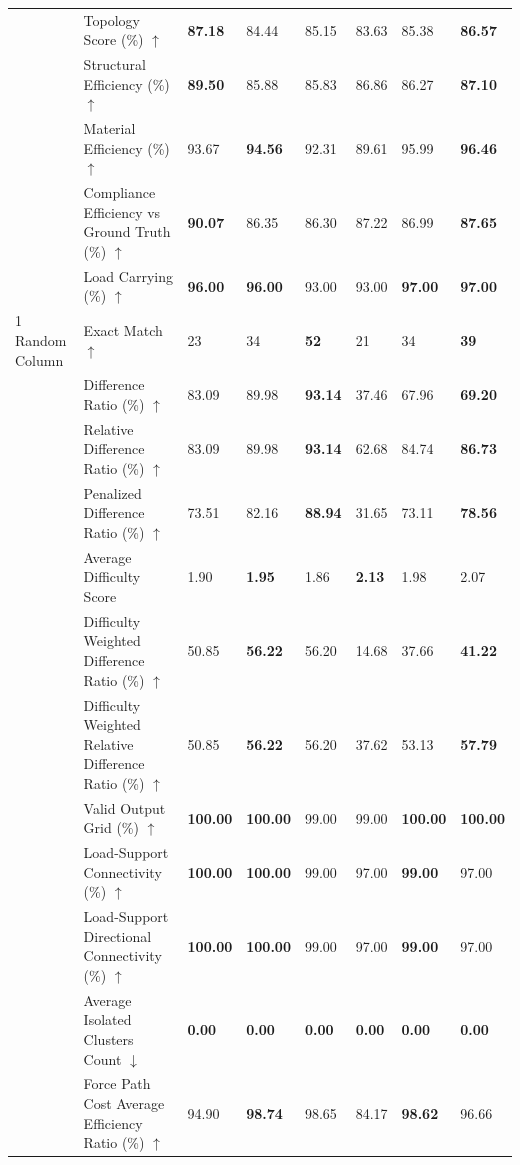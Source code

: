 \begin{table}[!h]
{\begin{tabular}{lllll|lll}
 & Topology Score (\%) $\uparrow$ & \textbf{87.18} & 84.44 & 85.15 & 83.63 & 85.38 & \textbf{86.57} \\
 & Structural Efficiency (\%) $\uparrow$ & \textbf{89.50} & 85.88 & 85.83 & 86.86 & 86.27 & \textbf{87.10} \\
 & Material Efficiency (\%) $\uparrow$ & 93.67 & \textbf{94.56} & 92.31 & 89.61 & 95.99 & \textbf{96.46} \\
 & Compliance Efficiency vs Ground Truth (\%) $\uparrow$ & \textbf{90.07} & 86.35 & 86.30 & 87.22 & 86.99 & \textbf{87.65} \\
 & Load Carrying (\%) $\uparrow$ & \textbf{96.00} & \textbf{96.00} & 93.00 & 93.00 & \textbf{97.00} & \textbf{97.00} \\
\midrule
1 Random Column & Exact Match $\uparrow$ & 23 & 34 & \textbf{52} & 21 & 34 & \textbf{39} \\
 & Difference Ratio (\%) $\uparrow$ & 83.09 & 89.98 & \textbf{93.14} & 37.46 & 67.96 & \textbf{69.20} \\
 & Relative Difference Ratio (\%) $\uparrow$ & 83.09 & 89.98 & \textbf{93.14} & 62.68 & 84.74 & \textbf{86.73} \\
 & Penalized Difference Ratio (\%) $\uparrow$ & 73.51 & 82.16 & \textbf{88.94} & 31.65 & 73.11 & \textbf{78.56} \\
 & Average Difficulty Score & 1.90 & \textbf{1.95} & 1.86 & \textbf{2.13} & 1.98 & 2.07 \\
 & Difficulty Weighted Difference Ratio (\%) $\uparrow$ & 50.85 & \textbf{56.22} & 56.20 & 14.68 & 37.66 & \textbf{41.22} \\
 & Difficulty Weighted Relative Difference Ratio (\%) $\uparrow$ & 50.85 & \textbf{56.22} & 56.20 & 37.62 & 53.13 & \textbf{57.79} \\
 & Valid Output Grid (\%) $\uparrow$ & \textbf{100.00} & \textbf{100.00} & 99.00 & 99.00 & \textbf{100.00} & \textbf{100.00} \\
 & Load-Support Connectivity (\%) $\uparrow$ & \textbf{100.00} & \textbf{100.00} & 99.00 & 97.00 & \textbf{99.00} & 97.00 \\
 & Load-Support Directional Connectivity (\%) $\uparrow$ & \textbf{100.00} & \textbf{100.00} & 99.00 & 97.00 & \textbf{99.00} & 97.00 \\
 & Average Isolated Clusters Count $\downarrow$ & \textbf{0.00} & \textbf{0.00} & \textbf{0.00} & \textbf{0.00} & \textbf{0.00} & \textbf{0.00} \\
 & Force Path Cost Average Efficiency Ratio (\%) $\uparrow$ & 94.90 & \textbf{98.74} & 98.65 & 84.17 & \textbf{98.62} & 96.66 \\

\end{tabular}}
\end{table}
